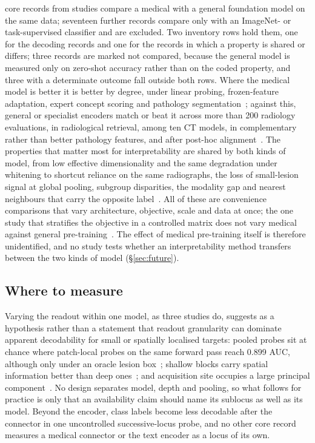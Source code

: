 \Nmvgrec{} core records from \Nmvgstud{} studies compare a
medical with a general foundation model on the same data; seventeen further records compare only with
an ImageNet- or task-supervised classifier and are excluded. Two inventory rows hold them, one for the
decoding records and one for the records in which a property is shared or differs; three records are
marked not compared, because the
general model is measured only on zero-shot accuracy rather than on the coded property, and three with
a determinate outcome fall outside both rows. Where the medical model is better it is better by degree, under
linear probing, frozen-feature adaptation, expert concept scoring and pathology
segmentation~\cite{li2025featurequality,germani2025bias,zhou2025generalist,kim2024transparent,song2024morphological,gildenblat2024segmentation,cui2026translating};
against this, general or specialist encoders match or beat it across more than 200 radiology
evaluations, in radiological retrieval, among ten CT models, in complementary rather than better
pathology features, and after post-hoc
alignment~\cite{baharoon2023dinov2,denner2024leveraging,chevli2026frozenct,neidlinger2025benchmark,folco2025semantic,wesp2026sparse}.
The properties that matter most for interpretability are shared by both kinds of model, from low
effective dimensionality and the same degradation under whitening to shortcut reliance on the same
radiographs, the loss of small-lesion signal at global pooling, subgroup disparities, the modality gap
and nearest neighbours that carry the opposite
label~\cite{garciahidalgo2026embedding,li2025featurequality,sourget2025fairness,muthyala2026frozen,jin2024fairmedfm,restrepo2026cone,arasteh2026candor}. All of these are convenience comparisons that vary architecture,
objective, scale and data at once; the one study that stratifies the objective in a controlled matrix
does not vary medical against general pre-training~\cite{tayebiarasteh2026self}. The effect of medical
pre-training itself is therefore unidentified, and no study tests whether an interpretability method
transfers between the two kinds of model (\S\ref{sec:future}).

\subsection{Where to measure}

Varying the readout within one model, as three studies do, suggests \textemdash{}
as a hypothesis rather than a statement \textemdash{} that readout granularity can dominate apparent decodability for small or
spatially localised targets: pooled probes sit at chance where patch-local probes on the same forward
pass reach 0.899 AUC, although only under an oracle lesion box~\cite{muthyala2026frozen}; shallow blocks
carry spatial information better than deep ones~\cite{vadori2025mind}; and acquisition site occupies a
large principal component~\cite{rahbar2026frozen}. No design separates model, depth and pooling, so
what follows for practice is only that an availability claim should name its sublocus as well as its
model. Beyond the encoder, class labels become less decodable after the connector in one uncontrolled
successive-locus probe, and no other core record measures a medical connector or the text encoder
as a locus of its own.
